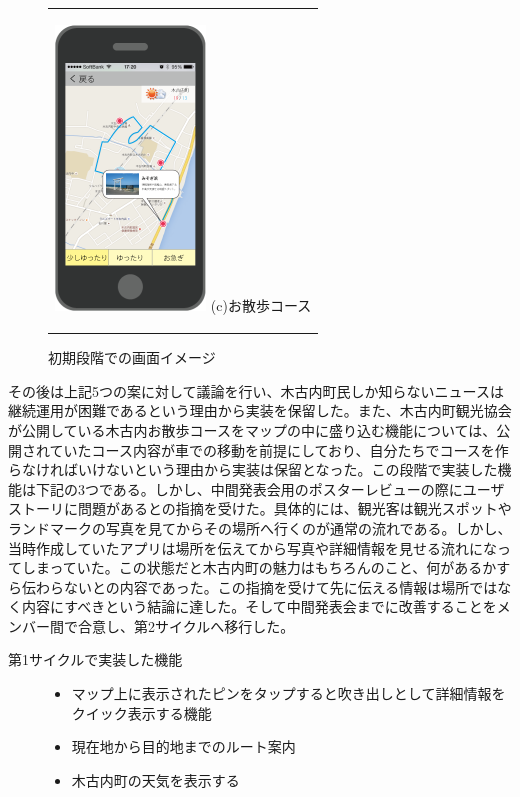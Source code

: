 \begin{figure}[htbp]
\begin{center}
\begin{tabular}{c}
      \begin{minipage}{0.33\hsize}
        \begin{center}
\includegraphics[width=4cm, bb=0 0 302 572]{5.2_sanpo.png}
          \hspace{1cm} (c)お散歩コース
        \end{center}
      \end{minipage}

    \end{tabular}
    \caption{初期段階での画面イメージ}
    \label{fig:lena}
  \end{center}
\end{figure}

その後は上記5つの案に対して議論を行い、木古内町民しか知らないニュースは継続運用が困難であるという理由から実装を保留した。また、木古内町観光協会が公開している木古内お散歩コースをマップの中に盛り込む機能については、公開されていたコース内容が車での移動を前提にしており、自分たちでコースを作らなければいけないという理由から実装は保留となった。この段階で実装した機能は下記の3つである。しかし、中間発表会用のポスターレビューの際にユーザストーリに問題があるとの指摘を受けた。具体的には、観光客は観光スポットやランドマークの写真を見てからその場所へ行くのが通常の流れである。しかし、当時作成していたアプリは場所を伝えてから写真や詳細情報を見せる流れになってしまっていた。この状態だと木古内町の魅力はもちろんのこと、何があるかすら伝わらないとの内容であった。この指摘を受けて先に伝える情報は場所ではなく内容にすべきという結論に達した。そして中間発表会までに改善することをメンバー間で合意し、第2サイクルへ移行した。
\begin{description}
\item[第1サイクルで実装した機能]\mbox{}
\begin{itemize}
 \item マップ上に表示されたピンをタップすると吹き出しとして詳細情報をクイック表示する機能
 \item 現在地から目的地までのルート案内
 \item 木古内町の天気を表示する
\end{itemize}
\end{description}

